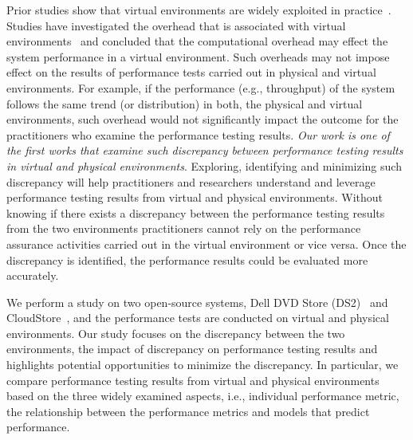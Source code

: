 \begin{sloppypar}
Prior studies show that virtual environments are widely exploited in practice~\cite{Cito:2015:MCA:2786805.2786826,Nguyen:2012:ADP:2188286.2188344,xiong2013vperfguard}. Studies have investigated the overhead that is associated with virtual environments~\cite{menon2005diagnosing} and concluded that the computational overhead may effect the system performance in a virtual environment. Such overheads may not impose effect on the results of performance tests carried out in physical and virtual environments. For example, if the performance (e.g., throughput) of the system follows the same trend (or distribution) in both, the physical and virtual environments, such overhead would not significantly impact the outcome for the practitioners who examine the performance testing results. \textit{Our work is one of the first works that examine such discrepancy between performance testing results in virtual and physical environments}. Exploring, identifying and minimizing such discrepancy will help practitioners and researchers understand and leverage performance testing results from virtual and physical environments. Without knowing if there exists a discrepancy between the performance testing results from the two environments practitioners cannot rely on the performance assurance activities carried out in the virtual environment or vice versa. Once the discrepancy is identified, the performance results could be evaluated more accurately.
\end{sloppypar}

We perform a study on two open-source systems, Dell DVD Store (DS2)~\cite{delldvd} and CloudStore~\cite{cloudstore}, and the performance tests are conducted on virtual and physical environments. Our study focuses on the discrepancy between the two environments, the impact of discrepancy on performance testing results and highlights potential opportunities to minimize the discrepancy. In particular, we compare performance testing results from virtual and physical environments based on the three widely examined aspects, i.e., individual performance metric, the relationship between the performance metrics and models that predict performance. 

